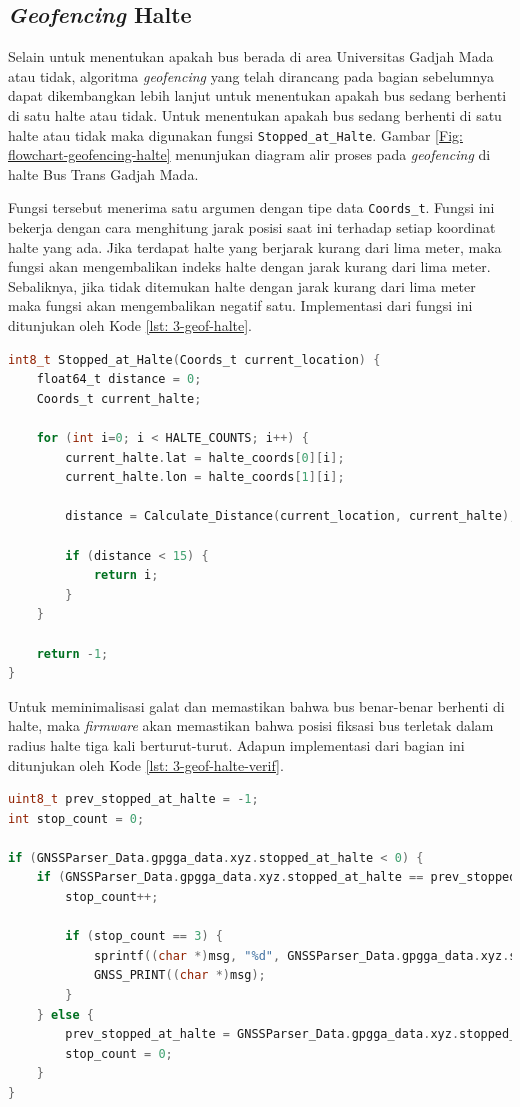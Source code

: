 \subsection{\textit{Geofencing} Halte}
Selain untuk menentukan apakah bus berada di area Universitas Gadjah Mada atau tidak, algoritma \textit{geofencing} yang telah dirancang pada bagian sebelumnya dapat dikembangkan lebih lanjut untuk menentukan apakah bus sedang berhenti di satu halte atau tidak. Untuk menentukan apakah bus sedang berhenti di satu halte atau tidak maka digunakan fungsi \texttt{Stopped\_at\_Halte}. Gambar \ref{Fig: flowchart-geofencing-halte} menunjukan diagram alir proses pada \textit{geofencing} di halte Bus Trans Gadjah Mada. 

Fungsi tersebut menerima satu argumen dengan tipe data \texttt{Coords\_t}. Fungsi ini bekerja dengan cara menghitung jarak posisi saat ini terhadap setiap koordinat halte yang ada. Jika terdapat halte yang berjarak kurang dari lima meter, maka fungsi akan mengembalikan indeks halte dengan jarak kurang dari lima meter. Sebaliknya, jika tidak ditemukan halte dengan jarak kurang dari lima meter maka fungsi akan mengembalikan negatif satu. Implementasi dari fungsi ini ditunjukan oleh Kode \ref{lst: 3-geof-halte}.

\vspace{0.3cm}
\begin{lstlisting}[language=c, style=mystyle, caption={Implementasi \textit{Geofencing} Halte}, label={lst: 3-geof-halte}]
int8_t Stopped_at_Halte(Coords_t current_location) {
	float64_t distance = 0;
	Coords_t current_halte;
	
	for (int i=0; i < HALTE_COUNTS; i++) {
		current_halte.lat = halte_coords[0][i];
		current_halte.lon = halte_coords[1][i];
		
		distance = Calculate_Distance(current_location, current_halte);
		
		if (distance < 15) {
			return i;
		}
	}
	
	return -1;
}
\end{lstlisting}

Untuk meminimalisasi galat dan memastikan bahwa bus benar-benar berhenti di halte, maka \textit{firmware} akan memastikan bahwa posisi fiksasi bus terletak dalam radius halte tiga kali berturut-turut. Adapun implementasi dari bagian ini ditunjukan oleh Kode \ref{lst: 3-geof-halte-verif}.

\vspace{0.3cm}
\begin{lstlisting}[language=c, style=mystyle, caption={Implementasi Verifikasi Halte Saat Ini}, label={lst: 3-geof-halte-verif}]
uint8_t prev_stopped_at_halte = -1;
int stop_count = 0; 

if (GNSSParser_Data.gpgga_data.xyz.stopped_at_halte < 0) {
	if (GNSSParser_Data.gpgga_data.xyz.stopped_at_halte == prev_stopped_at_halte) {
		stop_count++; 
		
		if (stop_count == 3) { 
			sprintf((char *)msg, "%d", GNSSParser_Data.gpgga_data.xyz.stopped_at_halte);
			GNSS_PRINT((char *)msg);
		}
	} else {
		prev_stopped_at_halte = GNSSParser_Data.gpgga_data.xyz.stopped_at_halte;
		stop_count = 0; 
	}
}
\end{lstlisting}

